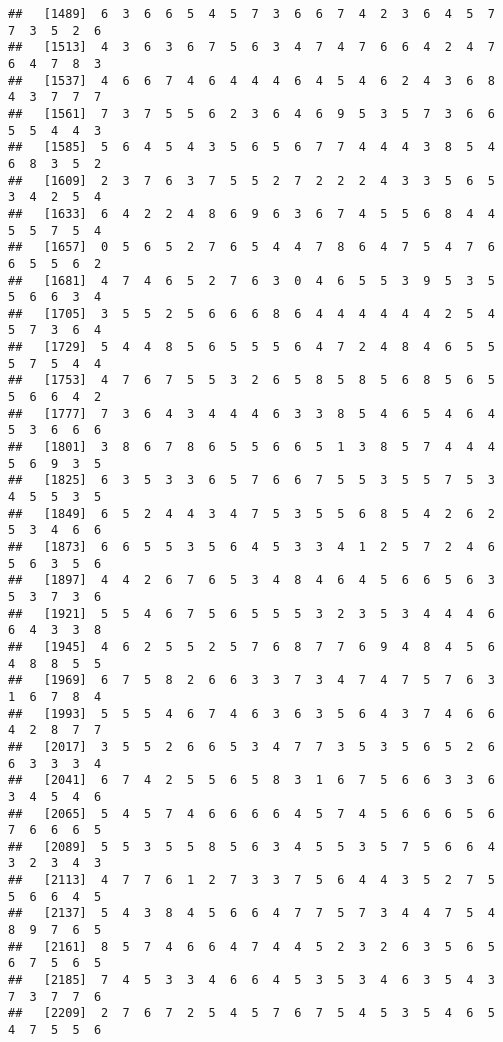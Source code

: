 \documentclass[
]{book}
\begin{document}
\begin{verbatim}
##   [1489]  6  3  6  6  5  4  5  7  3  6  6  7  4  2  3  6  4  5  7  7  3  5  2  6
##   [1513]  4  3  6  3  6  7  5  6  3  4  7  4  7  6  6  4  2  4  7  6  4  7  8  3
##   [1537]  4  6  6  7  4  6  4  4  4  6  4  5  4  6  2  4  3  6  8  4  3  7  7  7
##   [1561]  7  3  7  5  5  6  2  3  6  4  6  9  5  3  5  7  3  6  6  5  5  4  4  3
##   [1585]  5  6  4  5  4  3  5  6  5  6  7  7  4  4  4  3  8  5  4  6  8  3  5  2
##   [1609]  2  3  7  6  3  7  5  5  2  7  2  2  2  4  3  3  5  6  5  3  4  2  5  4
##   [1633]  6  4  2  2  4  8  6  9  6  3  6  7  4  5  5  6  8  4  4  5  5  7  5  4
##   [1657]  0  5  6  5  2  7  6  5  4  4  7  8  6  4  7  5  4  7  6  6  5  5  6  2
##   [1681]  4  7  4  6  5  2  7  6  3  0  4  6  5  5  3  9  5  3  5  5  6  6  3  4
##   [1705]  3  5  5  2  5  6  6  6  8  6  4  4  4  4  4  4  2  5  4  5  7  3  6  4
##   [1729]  5  4  4  8  5  6  5  5  5  6  4  7  2  4  8  4  6  5  5  5  7  5  4  4
##   [1753]  4  7  6  7  5  5  3  2  6  5  8  5  8  5  6  8  5  6  5  5  6  6  4  2
##   [1777]  7  3  6  4  3  4  4  4  6  3  3  8  5  4  6  5  4  6  4  5  3  6  6  6
##   [1801]  3  8  6  7  8  6  5  5  6  6  5  1  3  8  5  7  4  4  4  5  6  9  3  5
##   [1825]  6  3  5  3  3  6  5  7  6  6  7  5  5  3  5  5  7  5  3  4  5  5  3  5
##   [1849]  6  5  2  4  4  3  4  7  5  3  5  5  6  8  5  4  2  6  2  5  3  4  6  6
##   [1873]  6  6  5  5  3  5  6  4  5  3  3  4  1  2  5  7  2  4  6  5  6  3  5  6
##   [1897]  4  4  2  6  7  6  5  3  4  8  4  6  4  5  6  6  5  6  3  5  3  7  3  6
##   [1921]  5  5  4  6  7  5  6  5  5  5  3  2  3  5  3  4  4  4  6  6  4  3  3  8
##   [1945]  4  6  2  5  5  2  5  7  6  8  7  7  6  9  4  8  4  5  6  4  8  8  5  5
##   [1969]  6  7  5  8  2  6  6  3  3  7  3  4  7  4  7  5  7  6  3  1  6  7  8  4
##   [1993]  5  5  5  4  6  7  4  6  3  6  3  5  6  4  3  7  4  6  6  4  2  8  7  7
##   [2017]  3  5  5  2  6  6  5  3  4  7  7  3  5  3  5  6  5  2  6  6  3  3  3  4
##   [2041]  6  7  4  2  5  5  6  5  8  3  1  6  7  5  6  6  3  3  6  3  4  5  4  6
##   [2065]  5  4  5  7  4  6  6  6  6  4  5  7  4  5  6  6  6  5  6  7  6  6  6  5
##   [2089]  5  5  3  5  5  8  5  6  3  4  5  5  3  5  7  5  6  6  4  3  2  3  4  3
##   [2113]  4  7  7  6  1  2  7  3  3  7  5  6  4  4  3  5  2  7  5  5  6  6  4  5
##   [2137]  5  4  3  8  4  5  6  6  4  7  7  5  7  3  4  4  7  5  4  8  9  7  6  5
##   [2161]  8  5  7  4  6  6  4  7  4  4  5  2  3  2  6  3  5  6  5  6  7  5  6  5
##   [2185]  7  4  5  3  3  4  6  6  4  5  3  5  3  4  6  3  5  4  3  7  3  7  7  6
##   [2209]  2  7  6  7  2  5  4  5  7  6  7  5  4  5  3  5  4  6  5  4  7  5  5  6

\end{verbatim}
\end{document}
